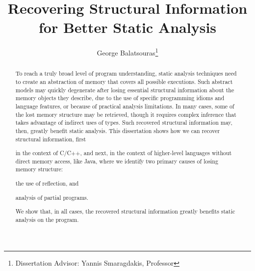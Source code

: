 \documentclass{llncs}
\begin{document}
\pagestyle{headings}

\mainmatter 

\title{Recovering Structural Information for Better Static Analysis}
\author{George Balatsouras\thanks{Dissertation Advisor: Yannis Smaragdakis, Professor}}


\maketitle              

\pagestyle{empty}

\begin{abstract}

  To reach a truly broad level of program understanding, static
  analysis techniques need to create an abstraction of memory that
  covers all possible executions. Such abstract models may quickly
  degenerate after losing essential structural information about the
  memory objects they describe, due to the use of specific programming
  idioms and language features, or because of practical analysis
  limitations. In many cases, some of the lost memory structure may be
  retrieved, though it requires complex inference that takes advantage
  of indirect uses of types. Such recovered structural information
  may, then, greatly benefit static analysis.
  This dissertation shows how we can recover structural information,
  first
  \begin{inparaenum}[(i)]
  \item in the context of C/C++, and next, in the context of
    higher-level languages without direct memory access, like Java,
    where we identify two primary causes of losing memory structure:
  \item the use of reflection, and
  \item analysis of partial programs.
  \end{inparaenum}
  We show that, in all cases, the recovered structural information
  greatly benefits static analysis on the program.


\end{abstract}
\end{document}
